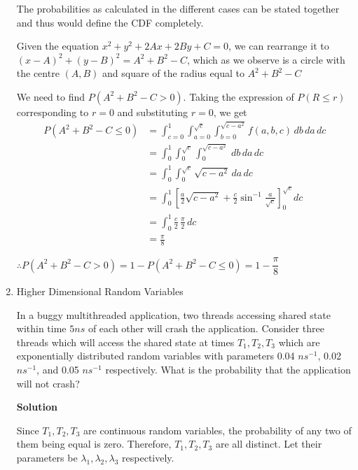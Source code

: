 \documentclass[12pt, oneside]{article}
\begin{document}
\begin{enumerate}
{    The probabilities as calculated in the different cases can be stated together and
    thus would define the CDF completely.

    Given the equation \(x^2 + y^2 + 2Ax + 2By + C = 0\), we can rearrange it to
    \((x - A)^2 + (y - B)^2 = A^2 + B^2 - C\), which as we observe is a circle with the
    centre \((A, B)\) and square of the radius equal to \(A^2 + B^2 - C\)

    We need to find \(P(A^2 + B^2 - C > 0)\). Taking the expression of \(P(R \leq r)\)
    corresponding to \(r = 0\) and substituting \(r = 0\), we get
    \begin{align*}
        P(A^2 + B^2 - C \leq 0) &= \int_{c = 0}^{1} \int_{a=0}^{\sqrt{c}} 
                                    \int_{b = 0}^{\sqrt{c - a^2}} f(a, b, c)\, db\, da\, dc \\
                                &= \int_{0}^{1} \int_{0}^{\sqrt{c}} 
                                \int_{0}^{\sqrt{c - a^2}} \, db\, da\, dc \\
                                &= \int_{0}^{1} \int_{0}^{\sqrt{c}} \sqrt{c - a^2}\, da\, dc \\
                                &= \int_{0}^{1} \left[\frac{a}{2}\sqrt{c - a^2} + \frac{c}{2}
                                    \sin^{-1}{\frac{a}{\sqrt{c}}}\right]^{\sqrt{c}}_{0} dc \\
                                &= \int_{0}^{1} \frac{c}{2} \, \frac{\pi}{2} \, dc \\
                                &= \frac{\pi}{8}
    \end{align*}

    \(\therefore P(A^2 + B^2 - C > 0) = 1 - P(A^2 + B^2 - C \leq 0) = 1 - \dfrac{\pi}{8}\)
}

\item {
    Higher Dimensional Random Variables

    In a buggy multithreaded application, two threads accessing shared state within time
    \(5 ns\) of each other will crash the application. Consider three threads which will 
    access the shared state at times \(T_1, T_2, T_3\) which are exponentially
    distributed random variables with parameters 0.04 \(ns^{-1}\), 0.02 \(ns^{-1}\),
    and 0.05 \(ns^{-1}\) respectively. What is the probability that the application will
    not crash?

    \textbf{Solution}

    Since \(T_1, T_2, T_3\) are continuous random variables, the probability of any two
    of them being equal is zero. Therefore, \(T_1, T_2, T_3\) are all distinct. Let their
    parameters be \(\lambda_1, \lambda_2, \lambda_3\) respectively.

}
\end{enumerate}
\end{document}
